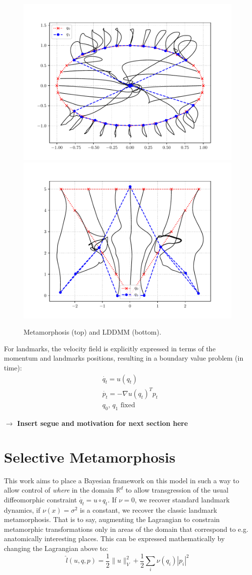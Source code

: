 \documentclass[runningheads]{llncs}
\newcommand{\half}{\frac 12}
\newcommand{\norm}[2]{\| #1 \|_{ #2 }}
\newcommand{\vnorm}[1]{\norm{ #1 }{V}}
\newcommand{\Rd}{\mathbb{R}^{d}}
\begin{document}
\begin{figure}
\begin{minipage}{\textwidth}
    \includegraphics[width=.3\textwidth]{../src/vanilla_results/lddmm/lddmm_squeeze.pdf}\quad
    \includegraphics[width=.3\textwidth]{../src/vanilla_results/lddmm/lddmm_triangle_flip.pdf}
    \caption{Metamorphosis (top) and LDDMM (bottom).}
    \label{fig:mm_lddmm}
\end{minipage}
\end{figure}

For landmarks, the velocity field is explicitly expressed in terms of the
momentum and landmarks positions, resulting in a boundary value problem (in
time):
\begin{align}
& \dot{q_t} = u(q_t)\\
& \dot{p_t} = - \nabla u(q_t)^T p_t\\
& q_0,\,q_1\text{ fixed}
\end{align}

\textbf{$\longrightarrow$ Insert segue and motivation for next section here}

\section{Selective Metamorphosis}\label{sec:select_mm}

This work aims to place a Bayesian framework on this model in such a way to
allow control of \emph{where} in the domain $\Rd$ to allow transgression of the
usual diffeomorphic constraint $\dot{q_t} = u\circ q_t$. If $\nu=0$, we recover
standard landmark dynamics, if $\nu(x)=\sigma^2$ is a constant, we recover the
classic landmark metamorphosis. That is to say, augmenting the Lagrangian to
constrain metamorphic transformations only in areas of the domain that
correspond to e.g. anatomically interesting places.  This can be expressed
mathematically by changing the Lagrangian above to:
\[
\hat l(u, q, p) = \half\vnorm{u}^2 + \half\sum_i \nu(q_i)|p_i|^2
\]
\end{document}
